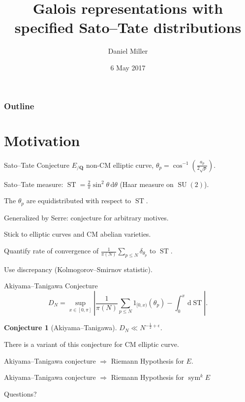 \documentclass[handout]{beamer}
\title{Galois representations with specified Sato--Tate distributions}
\author{Daniel Miller}
\institute{Cornell University}
\date{6 May 2017}
\DeclareMathOperator{\ST}{ST}
\DeclareMathOperator{\SU}{SU}
\DeclareMathOperator{\sym}{sym}
\newcommand{\bQ}{\mathbf{Q}}
\newcommand{\dd}{\mathrm{d}}
\newtheorem{conjecture}{Conjecture}
\begin{document}
\begin{frame}
\titlepage
\end{frame}

\begin{frame}
\frametitle{Outline}
\tableofcontents
\end{frame}





\section{Motivation}

\begin{frame}{Sato--Tate Conjecture}
$E_{/\bQ}$ non-CM elliptic curve, $\theta_p = \cos^{-1}\left( \frac{a_p}{2\sqrt p}\right)$. 
\pause

Sato--Tate measure: $\ST = \frac{2}{\pi} \sin^2 \theta\, \dd \theta$ (Haar 
measure on $\SU(2)$). 
\pause

\begin{theorem}[Taylor et.~al.]
The $\theta_p$ are equidistributed with respect to $\ST$. 
\end{theorem}
\pause

Generalized by Serre: conjecture for arbitrary motives. 
\pause

Stick to elliptic curves and CM abelian varieties.
\pause

Quantify rate of convergence of 
$\frac{1}{\pi(N)} \sum_{p\leqslant N} \delta_{\theta_p}$ to $\ST$. 
\pause

Use discrepancy (Kolmogorov--Smirnov statistic). 
\end{frame}


\begin{frame}{Akiyama--Tanigawa Conjecture}
\[
	D_N = \sup_{x\in [0,\pi]}\left| \frac{1}{\pi(N)} \sum_{p\leqslant N} 1_{[0,x)}(\theta_p) - \int_0^x \, \dd\ST\right| .
\]
\pause

\begin{conjecture}[Akiyama--Tanigawa]
$D_N \ll N^{-\frac 1 2 + \epsilon}$. 
\end{conjecture}
\pause

There is a variant of this conjecture for CM elliptic curve.
\pause

\begin{theorem}
Akiyama--Tanigawa conjecture $\Rightarrow$ Riemann Hypothesis for $E$.
\end{theorem}
\pause

\begin{theorem}[Mazur]
Akiyama--Tanigawa conjecture $\Rightarrow$ Riemann Hypothesis for $\sym^k E$
\end{theorem}
\end{frame}





\begin{frame}
\begin{center}
\Huge Questions?
\end{center}
\end{frame}
\end{document}
